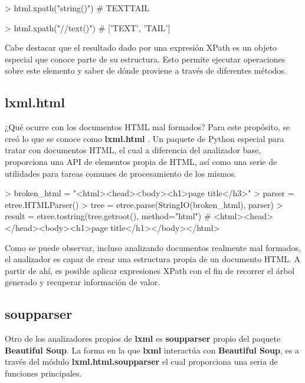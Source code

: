 \begin{Schunk}
    \begin{Soutput}
        > html.xpath("string()")
        # TEXTTAIL

        > html.xpath("//text()")
        # ['TEXT', 'TAIL']
    \end{Soutput}
\end{Schunk}

Cabe destacar que el resultado dado por una expresión XPath es un objeto especial que conoce parte de su
estructura. Esto permite ejecutar operaciones sobre este elemento y saber de dónde proviene a través de
diferentes métodos.

\subsection{lxml.html}
\label{subsec:lxml.html}

¿Qué ocurre con los documentos HTML mal formados? Para este propósito, se creó lo que se conoce como
\textbf{lxml.html} \cite{lxml}. Un paquete de Python especial para tratar con documentos HTML, el cual 
a diferencia del analizador base, proporciona una API de elementos propia de HTML, así como una serie de 
utilidades para tareas comunes de procesamiento de los mismos.

\begin{Schunk}
    \begin{Soutput}
        > broken_html = "<html><head><body><h1>page title</h3>"
        > parser = etree.HTMLParser()
        > tree   = etree.parse(StringIO(broken_html), parser)
        > result = etree.tostring(tree.getroot(), method="html")
        # <html><head></head><body><h1>page title</h1></body></html>
    \end{Soutput}
\end{Schunk}

Como se puede observar, incluso analizando documentos realmente mal formados, el analizador es capaz de
crear una estructura propia de un documento HTML. A partir de ahí, es posible aplicar expresiones XPath con
el fin de recorrer el árbol generado y recuperar información de valor.

\subsection{soupparser}
\label{subsec:soupparser}

Otro de los analizadores propios de \textbf{lxml} es \textbf{soupparser} \cite{lxml} propio del paquete
\textbf{Beautiful Soup}. La forma en la que \textbf{lxml} interactúa con \textbf{Beautiful Soup}, es a 
través del módulo \textbf{lxml.html.soupparser} el cual proporciona una seria de funciones principales. 

